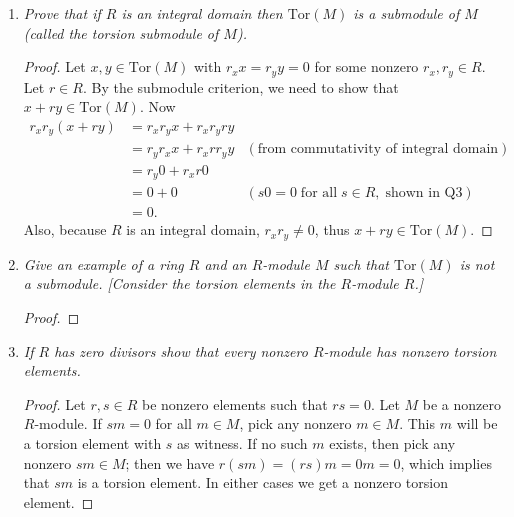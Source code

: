 \documentclass{article}
\begin{document}
  \begin{enumerate}[label={(\alph*)}]
    \item \it Prove that if $R$ is an integral domain then $\text{Tor}(M)$
      is a submodule of $M$ (called the torsion submodule of $M$).

      \begin{proof}
        Let $x,y\in\text{Tor}(M)$ with $r_xx=r_yy=0$ for some nonzero
        $r_x,r_y\in R$. Let $r\in R$. By the submodule criterion, we need
        to show that $x+ry\in\text{Tor}(M)$. Now
        \begin{align*}
          r_xr_y(x+ry) &= r_xr_yx+r_xr_yry \\
          &=r_yr_xx+r_xrr_yy &(\text{from commutativity of integral domain}) \\
          &=r_y0+r_xr0 \\
          &=0+0 &(s0=0\; \text{for all}\; s\in R,\; \text{shown in Q3}) \\
          &=0.
        \end{align*}
        Also, because $R$ is an integral domain, $r_xr_y\neq0$, thus
        $x+ry\in\text{Tor}(M)$.
      \end{proof}

    \item \it Give an example of a ring $R$ and an $R$-module $M$ such that
      $\text{Tor}(M)$ is not a submodule. [Consider the torsion elements in
      the $R$-module $R$.]

      \begin{proof}
      \end{proof}

    \item \it If $R$ has zero divisors show that every nonzero $R$-module
      has nonzero torsion elements.
      \begin{proof}
        Let $r,s\in R$ be nonzero elements such that $rs=0$. Let $M$ be
        a nonzero $R$-module. If $sm=0$ for all $m\in M$, pick any
        nonzero $m\in M$. This $m$ will be a torsion element with $s$ as
        witness. If no such $m$ exists, then pick any nonzero $sm\in M$;
        then we have $r(sm)=(rs)m=0m=0$, which implies that $sm$ is a
        torsion element. In either cases we get a nonzero torsion element.
      \end{proof}
  \end{enumerate}
\end{document}
